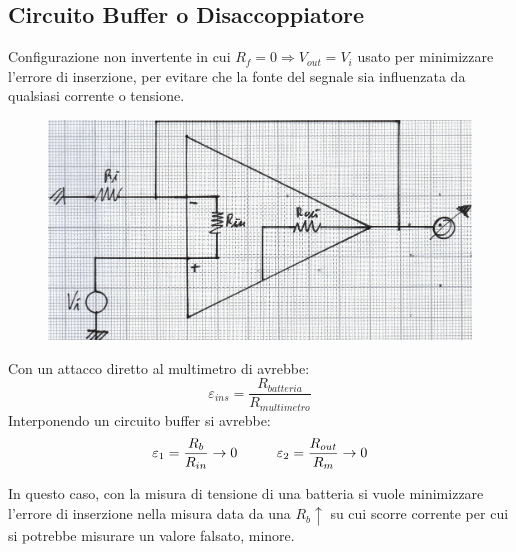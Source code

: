 \documentclass[a4paper, 15pt]{article}
\begin{document}
\subsection{Circuito Buffer o Disaccoppiatore}
\begin{adjustwidth}{2in}{}     		
   		Configurazione non invertente in cui $R_f = 0\Rightarrow V_{out} = V_i$ usato per minimizzare l'errore di inserzione, per evitare che la fonte del segnale sia influenzata da qualsiasi corrente o tensione.   		
   		\begin{figure}[H]
   			\centering
   			\includegraphics[width=0.5\linewidth]{immagini/mm(16)}
   			\label{fig:mm16}
   		\end{figure}  		
   		Con un attacco diretto al multimetro di avrebbe:
   		\[\varepsilon_{ins} = \dfrac{R_{batteria}}{R_{multimetro}}\]
   		Interponendo un circuito buffer si avrebbe: 
   		\[\varepsilon_1 = {R_b\over R_{in}}\rightarrow0\hspace{1cm} \varepsilon_2 = {R_{out}\over R_{m}}\rightarrow0\]
   		
   		In questo caso, con la misura di tensione di una batteria si vuole minimizzare l'errore di inserzione nella misura data da una $R_b\uparrow$ su cui scorre corrente per cui si potrebbe misurare un valore falsato, minore.  
\end{adjustwidth}
\end{document}
